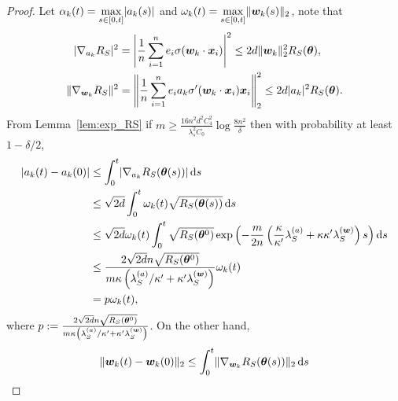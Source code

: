 \documentclass{article}
\begin{document}
\begin{proof}
    Let $\alpha_k(t) = \max\limits_{s\in[0,t]}\lvert a_k(s)\rvert$ and $\omega_k(t) = \max\limits_{s\in[0,t]}\lVert\bm{w}_k(s)\rVert_2$, note that
    \begin{equation}
        \begin{aligned}
            \lvert\nabla_{a_k}R_S\rvert^2    & =\left\lvert\frac{1}{n}\sum_{i=1}^n e_i\sigma(\bm{w}_k\cdot\bm{x}_i)\right\rvert^2\leq 2d\lVert\bm{w}_k\rVert^2_2R_S(\bm{\theta}),        \\
            \lVert\nabla_{\bm{w}_k}R_S\rVert^2 & =\left\lVert\frac{1}{n}\sum_{i=1}^n e_i a_k\sigma'(\bm{w}_k\cdot\bm{x}_i)\bm{x}_i\right\rVert^2_2\leq 2d\lvert a_k\rvert^2R_S(\bm{\theta}).
        \end{aligned}
    \end{equation}
    From Lemma~\ref{lem:exp_RS} if $m\geq \frac{16n^2d^2C_4^2}{\lambda_s^2C_0}\log\frac{8n^2}{\delta}$ then with probability at least $1 - \delta/2$,
    \begin{equation}
        \begin{aligned}
            \lvert a_k(t) - a_k(0)\rvert
             & \leq\int_0^t\lvert\nabla_{a_k}R_S(\bm{\theta}(s))\rvert\mathop{}\!\mathrm{d}{s}                                                                                                                             \\
             & \leq\sqrt{2d}\int_{0}^{t} \omega_k(t)\sqrt{R_S(\bm{\theta}(s))}\mathop{}\!\mathrm{d}{s}                                                                                                               \\
             & \leq\sqrt{2d}\omega_k(t)\int_{0}^{t}\sqrt{R_S(\bm{\theta}^0)}\exp\left(-\frac{m}{2n}\left(\frac{\kappa}{\kappa'}\lambda_S^{(a)}+\kappa\kappa'\lambda_S^{(\bm{w})}\right)s\right)\mathop{}\!\mathrm{d}{s} \\
             & \leq \frac{2\sqrt{2d}n\sqrt{R_S(\bm{\theta}^0)}}{m\kappa\left(\lambda^{(a)}_S/\kappa'+\kappa'\lambda_S^{(\bm{w})}\right)}\omega_k(t)                                                     \\
             & =p\omega_k(t),
        \end{aligned}
    \end{equation}
    where $p := \frac{2\sqrt{2d}n\sqrt{R_S(\bm{\theta}^0)}}{m\kappa\left(\lambda_S^{(a)}/\kappa'+\kappa'\lambda_S^{(\bm{w})}\right)}$. On the other hand,
    \begin{equation}
        \begin{aligned}
            \norm{\vw_k(t) - \vw_k(0)}_2
             & \leq \int_{0}^{t} \norm{\nabla_{\vw_k}\RS(\vtheta(s))}_2\diff{s}                                                                                                                      \\

\end{aligned}
\end{equation}
\end{proof}
\end{document}

